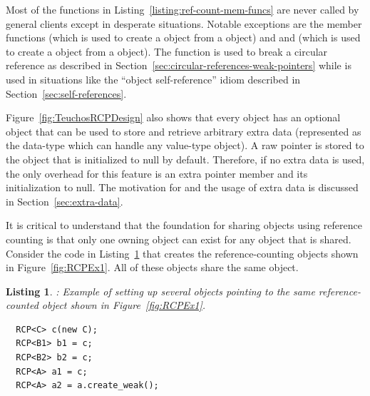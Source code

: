 \documentclass[pdf,ps2pdf,11pt]{SANDreport}
\newtheorem{listing}{Listing}
\begin{document}
Most of the functions in Listing~\ref{listing:ref-count-mem-funcs} are
never called by general clients except in desperate situations.
Notable exceptions are the member functions {}
(which is used to create a {} {} object from a
{} object) and and {} (which is used
to create a {} {} object from a {}
object).  The function {} is used to break a
circular reference as described in
Section~\ref{sec:circular-references-weak-pointers} while
{} is used in situations like the ``object
self-reference'' idiom described in Section~\ref{sec:self-references}.

Figure~\ref{fig:TeuchosRCPDesign} also shows that every
{} object has an optional {} object
that can be used to store and retrieve arbitrary extra data
(represented as the {} data-type which can handle any
value-type object).  A raw pointer is stored to the
{} object that is initialized to null by
default.  Therefore, if no extra data is used, the only overhead for
this feature is an extra pointer member and its initialization to
null.  The motivation for and the usage of extra data is discussed in
Section~\ref{sec:extra-data}.

It is critical to understand that the foundation for sharing objects
using reference counting is that only one owning {}
object can exist for any object that is shared.  Consider the code in
Listing~\ref{listing:rcp-example-4} that creates the
reference-counting objects shown in Figure~\ref{fig:RCPEx1}.  All of
these {} objects share the same {} object.


{}\begin{listing}: Example of setting up several {} objects
pointing to the same reference-counted object shown in
Figure~\ref{fig:RCPEx1}.
\label{listing:rcp-example-4}
{\small\begin{verbatim}
  RCP<C> c(new C);
  RCP<B1> b1 = c;
  RCP<B2> b2 = c;
  RCP<A> a1 = c;
  RCP<A> a2 = a.create_weak();
\end{verbatim}}
\end{listing}
\end{document}
